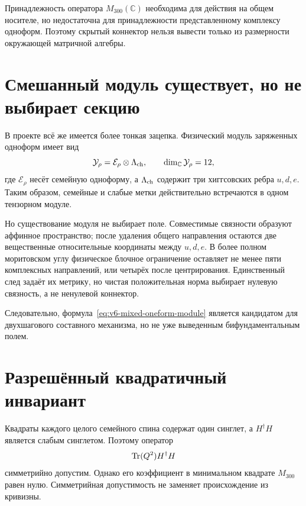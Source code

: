 \begin{proposition}
Принадлежность оператора $M_{300}(\mathbb C)$ необходима для действия на
общем носителе, но недостаточна для принадлежности представленному
комплексу одноформ. Поэтому скрытый коннектор нельзя вывести только из
размерности окружающей матричной алгебры.
\end{proposition}

\section{Смешанный модуль существует, но не выбирает секцию}

В проекте всё же имеется более тонкая зацепка. Физический модуль
заряженных одноформ имеет вид
\begin{equation}
 \mathcal Y_\rho=\mathcal E_\rho\otimes\Lambda_{\rm ch},
 \qquad
 \dim_{\mathbb C}\mathcal Y_\rho=12,
 \label{eq:v6-mixed-oneform-module}
\end{equation}
где $\mathcal E_\rho$ несёт семейную одноформу, а
$\Lambda_{\rm ch}$ содержит три хиггсовских ребра $u,d,e$. Таким
образом, семейные и слабые метки действительно встречаются в одном
тензорном модуле.

Но существование модуля не выбирает поле. Совместимые связности образуют
аффинное пространство; после удаления общего направления остаются две
вещественные относительные координаты между $u,d,e$. В более полном
моритовском углу физическое блочное ограничение оставляет не менее пяти
комплексных направлений, или четырёх после центрирования. Единственный
след задаёт их метрику, но чистая положительная норма выбирает нулевую
связность, а не ненулевой коннектор.

Следовательно, формула~\eqref{eq:v6-mixed-oneform-module} является
кандидатом для двухшагового составного механизма, но не уже выведенным
бифундаментальным полем.

\section{Разрешённый квадратичный инвариант}

Квадраты каждого целого семейного спина содержат один синглет, а
$H^\dagger H$ является слабым синглетом. Поэтому оператор
\begin{equation}
 \operatorname{Tr}(Q^2)H^\dagger H
\end{equation}
симметрийно допустим. Однако его коэффициент в минимальном квадрате
$M_{300}$ равен нулю. Симметрийная допустимость не заменяет происхождение
из кривизны.

